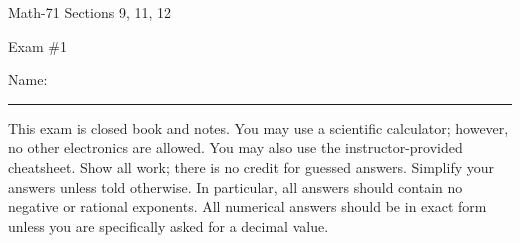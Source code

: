 \documentclass[letterpaper,12pt,fleqn]{article}
\begin{document}
\begin{center}
  \large
  Math-71 Sections 9, 11, 12

  \Large
  Exam \#1
\end{center}

\vspace{0.5in}

Name: \rule{4in}{1pt}

\vspace{0.5in}

This exam is closed book and notes. You may use a scientific calculator; however, no other electronics are allowed.  You may
also use the instructor-provided cheatsheet.  Show all work; there is no credit for guessed answers.  Simplify your answers
unless told otherwise.  In particular, all answers should contain no negative or rational exponents.  All numerical answers
should be in exact form unless you are specifically asked for a decimal value.  

\vspace{0.5in}
\end{document}
